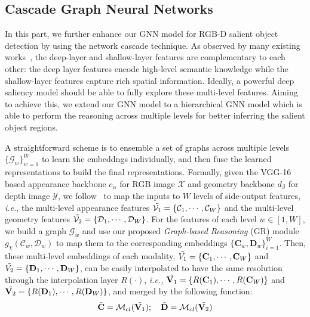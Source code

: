 \documentclass[runningheads]{llncs}
\begin{document}
	\subsection{Cascade Graph Neural Networks}
In this part, we further enhance our GNN model for RGB-D salient object detection by using the network cascade technique. As observed by many existing works~\cite{hou2017deeply,liu2016dhsnet,wang2016saliency,Fan_2020_CVPR}, the deep-layer and shallow-layer features are complementary to each other: the deep layer features encode high-level semantic knowledge while the shallow-layer features capture rich spatial information. Ideally, a powerful deep saliency model should be able to fully explore these multi-level features. Aiming to achieve this, we extend our GNN model to a hierarchical GNN model which is able to perform the reasoning across multiple levels for better inferring the salient object regions. 

A straightforward scheme is to ensemble a set of graphs across multiple levels $\{\mathcal {G}_w\}_{w=1}^W$ to learn the embeddngs individually, and then fuse the learned representations to build the final representations. Formally,  given the VGG-16 based appearance backbone $c_{\alpha}$ for RGB image $\mathcal X$ and geometry backbone $d_{\beta}$ for depth image $\mathcal Y$, we follow~\cite{hou2017deeply} to map the inputs to $W$ levels of side-output features, \emph{i.e.}, the multi-level appearance features $\Tilde{\mathcal{V}_1} = \{\mathcal C_1,\cdots,\mathcal C_W\}$ and the multi-level geometry features $\Tilde{\mathcal{V}_2} = \{\mathcal D_1,\cdots,\mathcal D_W\}$. For the features of each level $w \in [1, W]$, we build a graph ${\mathcal G}_w$ and use our proposed {\em Graph-based Reasoning} (GR) module $g_{\chi}(\mathcal C_w, \mathcal D_w)$ to map them to the corresponding embeddings $\{\mathbf C_w, \mathbf D_w\}^W_{i=1}$. Then, these multi-level embeddings of each modality, $\Tilde{{V}_1}= \{\mathbf C_1,\cdots,\mathbf C_W\}$ and $\Tilde{{V}_2}= \{\mathbf D_1,\cdots,\mathbf D_W\}$, can be easily interpolated to have the same resolution through the interpolation layer $R(\cdot)$, \emph{i.e.,} $\Tilde{{\mathbf V}_1}= \{R(\mathbf C_1),\cdots,R(\mathbf C_W)\}$ and $\Tilde{{\mathbf V}_2}= \{R(\mathbf D_1),\cdots,R(\mathbf D_W)\}$, and merged by the following function:
\begin{equation}
\begin{aligned}
\Tilde{\mathbf C} = \mathcal{M}_{cl} (\Tilde{\mathbf{V}_1}); \quad \Tilde{\mathbf D} = \mathcal{M}_{cl} (\Tilde{\mathbf{V}_2})
\label{eq8}
\end{aligned}
\end{equation}
\end{document}

